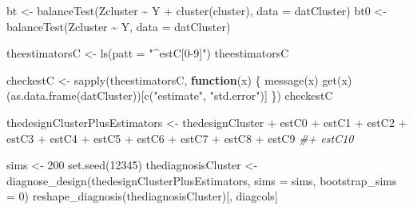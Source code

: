 \documentclass[
  12pt,
]{book}
\newenvironment{Shaded}{\begin{snugshade}}{\end{snugshade}}
\newcommand{\AttributeTok}[1]{\textcolor[rgb]{0.77,0.63,0.00}{#1}}
\newcommand{\CommentTok}[1]{\textcolor[rgb]{0.56,0.35,0.01}{\textit{#1}}}
\newcommand{\ControlFlowTok}[1]{\textcolor[rgb]{0.13,0.29,0.53}{\textbf{#1}}}
\newcommand{\DecValTok}[1]{\textcolor[rgb]{0.00,0.00,0.81}{#1}}
\newcommand{\FunctionTok}[1]{\textcolor[rgb]{0.00,0.00,0.00}{#1}}
\newcommand{\NormalTok}[1]{#1}
\newcommand{\OtherTok}[1]{\textcolor[rgb]{0.56,0.35,0.01}{#1}}
\newcommand{\SpecialCharTok}[1]{\textcolor[rgb]{0.00,0.00,0.00}{#1}}
\newcommand{\StringTok}[1]{\textcolor[rgb]{0.31,0.60,0.02}{#1}}
\theoremstyle{definition}
\theoremstyle{definition}
\theoremstyle{definition}
\theoremstyle{remark}
\begin{document}
\begin{Shaded}
\begin{Highlighting}[]
\NormalTok{bt }\OtherTok{\textless{}{-}} \FunctionTok{balanceTest}\NormalTok{(Zcluster }\SpecialCharTok{\textasciitilde{}}\NormalTok{ Y }\SpecialCharTok{+} \FunctionTok{cluster}\NormalTok{(cluster), }\AttributeTok{data =}\NormalTok{ datCluster)}
\NormalTok{bt0 }\OtherTok{\textless{}{-}} \FunctionTok{balanceTest}\NormalTok{(Zcluster }\SpecialCharTok{\textasciitilde{}}\NormalTok{ Y, }\AttributeTok{data =}\NormalTok{ datCluster)}

\NormalTok{theestimatorsC }\OtherTok{\textless{}{-}} \FunctionTok{ls}\NormalTok{(}\AttributeTok{patt =} \StringTok{"\^{}estC[0{-}9]"}\NormalTok{)}
\NormalTok{theestimatorsC}

\NormalTok{checkestC }\OtherTok{\textless{}{-}} \FunctionTok{sapply}\NormalTok{(theestimatorsC, }\ControlFlowTok{function}\NormalTok{(x) \{}
  \FunctionTok{message}\NormalTok{(x)}
  \FunctionTok{get}\NormalTok{(x)(}\FunctionTok{as.data.frame}\NormalTok{(datCluster))[}\FunctionTok{c}\NormalTok{(}\StringTok{"estimate"}\NormalTok{, }\StringTok{"std.error"}\NormalTok{)]}
\NormalTok{\})}
\NormalTok{checkestC}

\NormalTok{thedesignClusterPlusEstimators }\OtherTok{\textless{}{-}}\NormalTok{ thedesignCluster }\SpecialCharTok{+}
\NormalTok{  estC0 }\SpecialCharTok{+}\NormalTok{ estC1 }\SpecialCharTok{+}\NormalTok{ estC2 }\SpecialCharTok{+}\NormalTok{ estC3 }\SpecialCharTok{+}\NormalTok{ estC4 }\SpecialCharTok{+}\NormalTok{ estC5 }\SpecialCharTok{+}\NormalTok{ estC6 }\SpecialCharTok{+}\NormalTok{ estC7 }\SpecialCharTok{+}\NormalTok{ estC8 }\SpecialCharTok{+}\NormalTok{ estC9 }\CommentTok{\#+ estC10}
\end{Highlighting}
\end{Shaded}

\begin{Shaded}
\begin{Highlighting}[]
\NormalTok{sims }\OtherTok{\textless{}{-}} \DecValTok{200}
\FunctionTok{set.seed}\NormalTok{(}\DecValTok{12345}\NormalTok{)}
\NormalTok{thediagnosisCluster }\OtherTok{\textless{}{-}} \FunctionTok{diagnose\_design}\NormalTok{(thedesignClusterPlusEstimators, }\AttributeTok{sims =}\NormalTok{ sims, }\AttributeTok{bootstrap\_sims =} \DecValTok{0}\NormalTok{)}
\FunctionTok{reshape\_diagnosis}\NormalTok{(thediagnosisCluster)[, diagcols]}
\end{Highlighting}
\end{Shaded}
\end{document}
